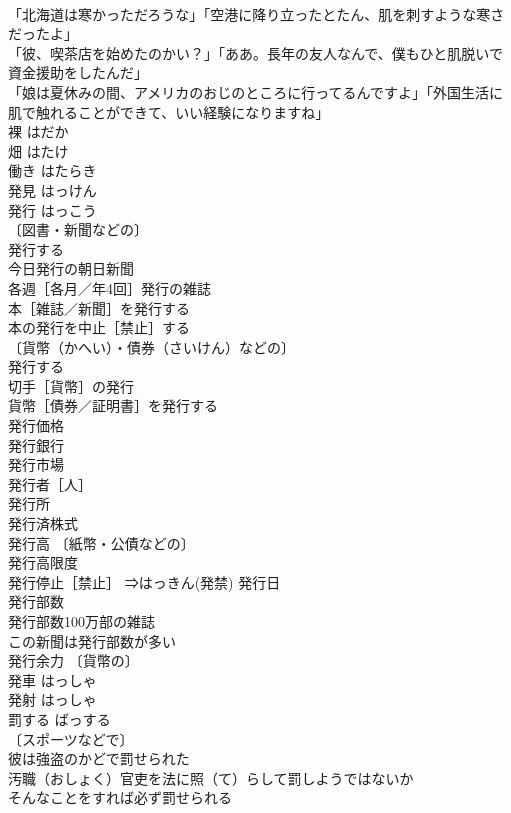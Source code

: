 \documentclass[8pt]{extreport}
\begin{document}
\begin{CJK}{UTF8}{min}
\\	「北海道は寒かっただろうな」「空港に降り立ったとたん、肌を刺すような寒さだったよ」 
\\	「彼、喫茶店を始めたのかい？」「ああ。長年の友人なんで、僕もひと肌脱いで資金援助をしたんだ」 
\\	「娘は夏休みの間、アメリカのおじのところに行ってるんですよ」「外国生活に肌で触れることができて、いい経験になりますね」 
\\	裸	はだか	
\\	畑	はたけ	
\\	働き	はたらき	
\\	発見	はっけん	
\\	発行	はっこう	
\\	〔図書・新聞などの〕
\\	発行する 
\\	今日発行の朝日新聞 
\\	各週［各月／年4回］発行の雑誌 
\\	本［雑誌／新聞］を発行する 
\\	本の発行を中止［禁止］する 
\\	〔貨幣（かへい）・債券（さいけん）などの〕
\\	発行する 
\\	切手［貨幣］の発行 
\\	貨幣［債券／証明書］を発行する 
\\	発行価格 
\\	発行銀行 
\\	発行市場 
\\	発行者［人］ 
\\	発行所 
\\	発行済株式 
\\	発行高 〔紙幣・公債などの〕
\\	発行高限度 
\\	発行停止［禁止］ ⇒はっきん(発禁) 発行日 
\\	発行部数 
\\	発行部数100万部の雑誌 
\\	この新聞は発行部数が多い 
\\	発行余力 〔貨幣の〕
\\	発車	はっしゃ	
\\	発射	はっしゃ	
\\	罰する	ばっする	
\\	〔スポーツなどで〕
\\	彼は強盗のかどで罰せられた 
\\	汚職（おしょく）官吏を法に照（て）らして罰しようではないか 
\\	そんなことをすれば必ず罰せられる 

\end{CJK}
\end{document}
